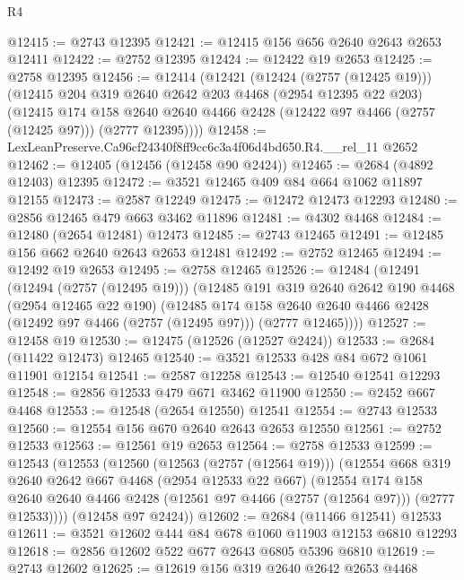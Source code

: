 \begin{lexlean}{R4}
\begin{coremodule}
@12415 := @2743 @12395
@12421 := @12415 @156 @656 @2640 @2643 @2653 @12411
@12422 := @2752 @12395
@12424 := @12422 @19 @2653
@12425 := @2758 @12395
@12456 := @12414
    (@12421
      (@12424 (@2757 (@12425 @19)))
      (@12415
        @204
        @319
        @2640
        @2642
        @203
        @4468
        (@2954 @12395 @22 @203)
        (@12415
          @174
          @158
          @2640
          @2640
          @4466
          @2428
          (@12422 @97 @4466 (@2757 (@12425 @97)))
          (@2777 @12395))))
@12458 := LexLeanPreserve.Ca96cf24340f8ff9cc6c3a4f06d4bd650.R4.__rel_11 @2652
@12462 := @12405 (@12456 (@12458 @90 @2424))
@12465 := @2684 (@4892 @12403) @12395
@12472 := @3521 @12465 @409 @84 @664 @1062 @11897 @12155
@12473 := @2587 @12249
@12475 := @12472 @12473 @12293
@12480 := @2856 @12465 @479 @663 @3462 @11896
@12481 := @4302 @4468
@12484 := @12480 (@2654 @12481) @12473
@12485 := @2743 @12465
@12491 := @12485 @156 @662 @2640 @2643 @2653 @12481
@12492 := @2752 @12465
@12494 := @12492 @19 @2653
@12495 := @2758 @12465
@12526 := @12484
    (@12491
      (@12494 (@2757 (@12495 @19)))
      (@12485
        @191
        @319
        @2640
        @2642
        @190
        @4468
        (@2954 @12465 @22 @190)
        (@12485
          @174
          @158
          @2640
          @2640
          @4466
          @2428
          (@12492 @97 @4466 (@2757 (@12495 @97)))
          (@2777 @12465))))
@12527 := @12458 @19
@12530 := @12475 (@12526 (@12527 @2424))
@12533 := @2684 (@11422 @12473) @12465
@12540 := @3521 @12533 @428 @84 @672 @1061 @11901 @12154
@12541 := @2587 @12258
@12543 := @12540 @12541 @12293
@12548 := @2856 @12533 @479 @671 @3462 @11900
@12550 := @2452 @667 @4468
@12553 := @12548 (@2654 @12550) @12541
@12554 := @2743 @12533
@12560 := @12554 @156 @670 @2640 @2643 @2653 @12550
@12561 := @2752 @12533
@12563 := @12561 @19 @2653
@12564 := @2758 @12533
@12599 := @12543
    (@12553
      (@12560
        (@12563 (@2757 (@12564 @19)))
        (@12554
          @668
          @319
          @2640
          @2642
          @667
          @4468
          (@2954 @12533 @22 @667)
          (@12554
            @174
            @158
            @2640
            @2640
            @4466
            @2428
            (@12561 @97 @4466 (@2757 (@12564 @97)))
            (@2777 @12533))))
      (@12458 @97 @2424))
@12602 := @2684 (@11466 @12541) @12533
@12611 := @3521 @12602 @444 @84 @678 @1060 @11903 @12153 @6810 @12293
@12618 := @2856 @12602 @522 @677 @2643 @6805 @5396 @6810
@12619 := @2743 @12602
@12625 := @12619 @156 @319 @2640 @2642 @2653 @4468

\end{coremodule}
\end{lexlean}

